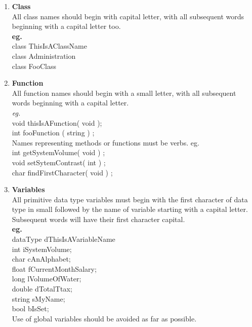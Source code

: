 \documentclass[11pt]{article}
\begin{document}
  \begin{enumerate}
  
\item \textbf{Class} \\
All class names should begin with capital letter, with all subsequent words beginning with a capital letter 
too.\\
\textbf{eg.} \\
class ThisIsAClassName{}\\  
class Administration{}\\
class FooClass {}\\

\item \textbf{Function}\\
All function names should begin with a small letter, with all subsequent words beginning with a capital  
letter.\\
\emph{eg.}\\
void thisIsAFunction( void );\\
int fooFunction ( string ) ;\\

Names representing methods or functions must be verbs.
eg.\\
int getSystemVolume( void ) ;\\
void setSytemContrast( int ) ;\\
char findFirstCharacter( void ) ;\\

\item \textbf{Variables}\\
All primitive data type variables must begin with the first character of data type in small followed by the 
name of variable starting with a capital letter. Subsequent words will have their first character capital.\\
\textbf{eg.}\\
dataType dThisIsAVariableName\\
int          iSystemVolume; \\
char       cAnAlphabet;\\
float       fCurrentMonthSalary;\\
long       lVolumeOfWater;\\
double   dTotalTtax;\\
string     sMyName;\\
bool       bIsSet;\\

Use of global variables should be avoided as far as possible.


\end{enumerate}
\end{document}
